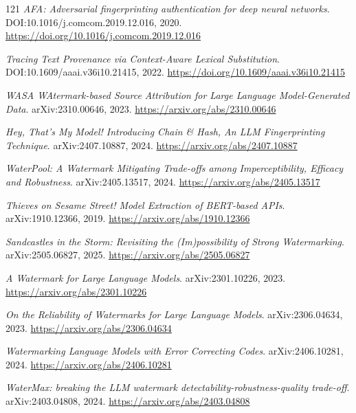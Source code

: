 \documentclass[11pt,a4paper]{article}
\begin{document}
\begin{thebibliography}{121}
\newblock \emph{AFA: Adversarial fingerprinting authentication for deep neural networks}.
\newblock DOI:10.1016/j.comcom.2019.12.016, 2020.
\newblock \url{https://doi.org/10.1016/j.comcom.2019.12.016}

\newblock \emph{Tracing Text Provenance via Context-Aware Lexical Substitution}.
\newblock DOI:10.1609/aaai.v36i10.21415, 2022.
\newblock \url{https://doi.org/10.1609/aaai.v36i10.21415}

\newblock \emph{WASA WAtermark-based Source Attribution for Large Language Model-Generated Data}.
\newblock arXiv:2310.00646, 2023.
\newblock \url{https://arxiv.org/abs/2310.00646}

\newblock \emph{Hey, That's My Model! Introducing Chain \& Hash, An LLM Fingerprinting Technique}.
\newblock arXiv:2407.10887, 2024.
\newblock \url{https://arxiv.org/abs/2407.10887}

\newblock \emph{WaterPool: A Watermark Mitigating Trade-offs among Imperceptibility, Efficacy and Robustness}.
\newblock arXiv:2405.13517, 2024.
\newblock \url{https://arxiv.org/abs/2405.13517}

\newblock \emph{Thieves on Sesame Street! Model Extraction of BERT-based APIs}.
\newblock arXiv:1910.12366, 2019.
\newblock \url{https://arxiv.org/abs/1910.12366}

\newblock \emph{Sandcastles in the Storm: Revisiting the (Im)possibility of Strong Watermarking}.
\newblock arXiv:2505.06827, 2025.
\newblock \url{https://arxiv.org/abs/2505.06827}

\newblock \emph{A Watermark for Large Language Models}.
\newblock arXiv:2301.10226, 2023.
\newblock \url{https://arxiv.org/abs/2301.10226}

\newblock \emph{On the Reliability of Watermarks for Large Language Models}.
\newblock arXiv:2306.04634, 2023.
\newblock \url{https://arxiv.org/abs/2306.04634}

\newblock \emph{Watermarking Language Models with Error Correcting Codes}.
\newblock arXiv:2406.10281, 2024.
\newblock \url{https://arxiv.org/abs/2406.10281}

\newblock \emph{WaterMax: breaking the LLM watermark detectability-robustness-quality trade-off}.
\newblock arXiv:2403.04808, 2024.
\newblock \url{https://arxiv.org/abs/2403.04808}


\end{thebibliography}
\end{document}
